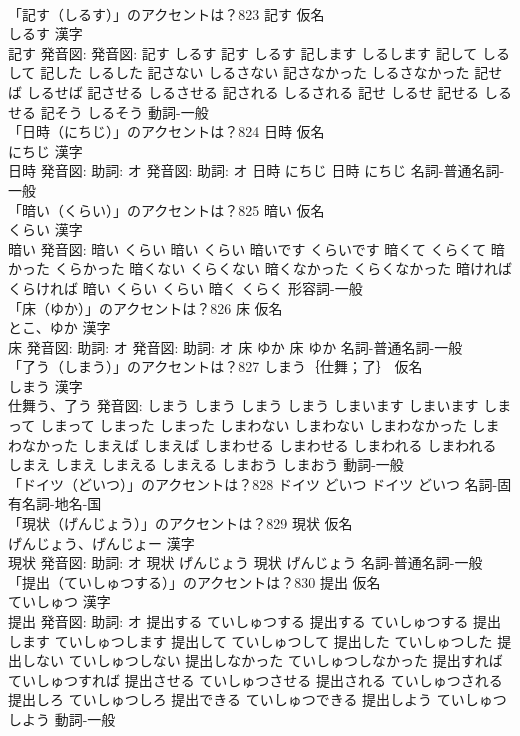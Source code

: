 \documentclass[8pt]{extreport}
\begin{document}
\begin{CJK}{UTF8}{min}
\\	「記す（しるす）」のアクセントは？823	記す 仮名　
\\	しるす 漢字　
\\	記す 発音図: 発音図:	記す しるす		記す しるす 記します しるします 記して しるして 記した しるした 記さない しるさない 記さなかった しるさなかった 記せば しるせば 記させる しるさせる 記される しるされる 記せ しるせ 記せる しるせる 記そう しるそう				動詞-一般 
\\	「日時（にちじ）」のアクセントは？824	日時 仮名　
\\	にちじ 漢字　
\\	日時 発音図: 助詞: オ 発音図: 助詞: オ	日時 にちじ		日時 にちじ				名詞-普通名詞-一般 
\\	「暗い（くらい）」のアクセントは？825	暗い 仮名　
\\	くらい 漢字　
\\	暗い 発音図:	暗い くらい		暗い くらい 暗いです くらいです 暗くて くらくて 暗かった くらかった 暗くない くらくない 暗くなかった くらくなかった 暗ければ くらければ 暗い くらい くらい 暗く くらく				形容詞-一般 
\\	「床（ゆか）」のアクセントは？826	床 仮名　
\\	とこ、ゆか 漢字　
\\	床 発音図: 助詞: オ 発音図: 助詞: オ	床 ゆか		床 ゆか				名詞-普通名詞-一般 
\\	「了う（しまう）」のアクセントは？827	しまう｛仕舞；了｝ 仮名　
\\	しまう 漢字　
\\	仕舞う、了う 発音図:	しまう しまう		しまう しまう しまいます しまいます しまって しまって しまった しまった しまわない しまわない しまわなかった しまわなかった しまえば しまえば しまわせる しまわせる しまわれる しまわれる しまえ しまえ しまえる しまえる しまおう しまおう				動詞-一般 
\\	「ドイツ（どいつ）」のアクセントは？828		ドイツ どいつ		ドイツ どいつ				名詞-固有名詞-地名-国 
\\	「現状（げんじょう）」のアクセントは？829	現状 仮名　
\\	げんじょう、げんじょー 漢字　
\\	現状 発音図: 助詞: オ	現状 げんじょう		現状 げんじょう				名詞-普通名詞-一般 
\\	「提出（ていしゅつする）」のアクセントは？830	提出 仮名　
\\	ていしゅつ 漢字　
\\	提出 発音図: 助詞: オ	提出する ていしゅつする		提出する ていしゅつする 提出します ていしゅつします 提出して ていしゅつして 提出した ていしゅつした 提出しない ていしゅつしない 提出しなかった ていしゅつしなかった 提出すれば ていしゅつすれば 提出させる ていしゅつさせる 提出される ていしゅつされる 提出しろ ていしゅつしろ 提出できる ていしゅつできる 提出しよう ていしゅつしよう				動詞-一般 

\end{CJK}
\end{document}
